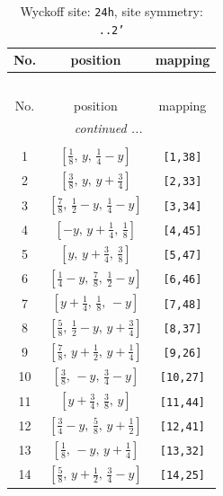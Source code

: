 \documentclass[fleqn,8pt]{jsarticle}
\begin{document}
\begin{longtable}{ccc}
\caption{Wyckoff site: {\tt 24h}, site symmetry: {\tt ..2'}}
 \\
 \hline \hline
No. & position & mapping \\ \hline \endfirsthead

\multicolumn{2}{l}{\tablename\ \thetable{}} \\
 \hline \hline
No. & position & mapping \\ \hline \endhead

 \hline \hline
\multicolumn{2}{r}{\footnotesize\it continued ...} \\ \endfoot

 \hline \hline
\multicolumn{2}{r}{} \\ \endlastfoot

1 & $\left[ \frac{1}{8},\, y,\, \frac{1}{4} - y \right]$ & {\tt [1,38]} \\ \hline
2 & $\left[ \frac{3}{8},\, y,\, y + \frac{3}{4} \right]$ & {\tt [2,33]} \\ \hline
3 & $\left[ \frac{7}{8},\, \frac{1}{2} - y,\, \frac{1}{4} - y \right]$ & {\tt [3,34]} \\ \hline
4 & $\left[ - y,\, y + \frac{1}{4},\, \frac{1}{8} \right]$ & {\tt [4,45]} \\ \hline
5 & $\left[ y,\, y + \frac{3}{4},\, \frac{3}{8} \right]$ & {\tt [5,47]} \\ \hline
6 & $\left[ \frac{1}{4} - y,\, \frac{7}{8},\, \frac{1}{2} - y \right]$ & {\tt [6,46]} \\ \hline
7 & $\left[ y + \frac{1}{4},\, \frac{1}{8},\, - y \right]$ & {\tt [7,48]} \\ \hline
8 & $\left[ \frac{5}{8},\, \frac{1}{2} - y,\, y + \frac{3}{4} \right]$ & {\tt [8,37]} \\ \hline
9 & $\left[ \frac{7}{8},\, y + \frac{1}{2},\, y + \frac{1}{4} \right]$ & {\tt [9,26]} \\ \hline
10 & $\left[ \frac{3}{8},\, - y,\, \frac{3}{4} - y \right]$ & {\tt [10,27]} \\ \hline
11 & $\left[ y + \frac{3}{4},\, \frac{3}{8},\, y \right]$ & {\tt [11,44]} \\ \hline
12 & $\left[ \frac{3}{4} - y,\, \frac{5}{8},\, y + \frac{1}{2} \right]$ & {\tt [12,41]} \\ \hline
13 & $\left[ \frac{1}{8},\, - y,\, y + \frac{1}{4} \right]$ & {\tt [13,32]} \\ \hline
14 & $\left[ \frac{5}{8},\, y + \frac{1}{2},\, \frac{3}{4} - y \right]$ & {\tt [14,25]} \\ \hline

\end{longtable}
\end{document}
